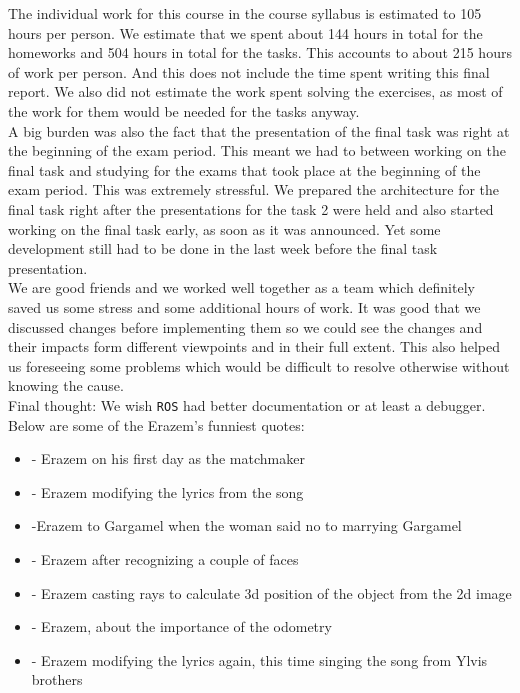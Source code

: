 \documentclass[12pt,a4paper]{article}
\begin{document}
	The individual work for this course in the course syllabus is estimated to 105 hours per person. We estimate that we spent about 144 hours in total for the homeworks and 504 hours in total for the tasks. This accounts to about 215 hours of work per person. And this does not include the time spent writing this final report. We also did not estimate the work spent solving the exercises, as most of the work for them would be needed for the tasks anyway. \\

	A big burden was also the fact that the presentation of the final task was right at the beginning of the exam period. This meant we had to  between working on the final task and studying for the exams that took place at the beginning of the exam period. This was extremely stressful. We prepared the architecture for the final task right after the presentations for the task 2 were held and also started working on the final task early, as soon as it was announced. Yet some development still had to be done in the last week before the final task presentation. \\
	
	We are good friends and we worked well together as a team which definitely saved us some stress and some additional hours of work. It was good that we discussed changes before implementing them so we could see the changes and their impacts form different viewpoints and in their full extent. This also helped us foreseeing some problems which would be difficult to resolve otherwise without knowing the cause. \\

	Final thought: We wish \texttt{ROS} had better documentation or at least a debugger. \\


	Below are some of the Erazem's funniest quotes: 
	\begin{itemize}
		\item {} - Erazem on his first day as the matchmaker
		\item {} - Erazem modifying the lyrics from the song
		\item {} -Erazem to Gargamel when the woman said no to marrying Gargamel
		\item {} - Erazem after recognizing a couple of faces
		\item {} - Erazem casting rays to calculate 3d position of the object from the 2d image
		\item {} - Erazem, about the importance of the odometry
		\item {} - Erazem modifying the lyrics again, this time singing the song from Ylvis brothers 
	\end{itemize}
	
\end{document}
